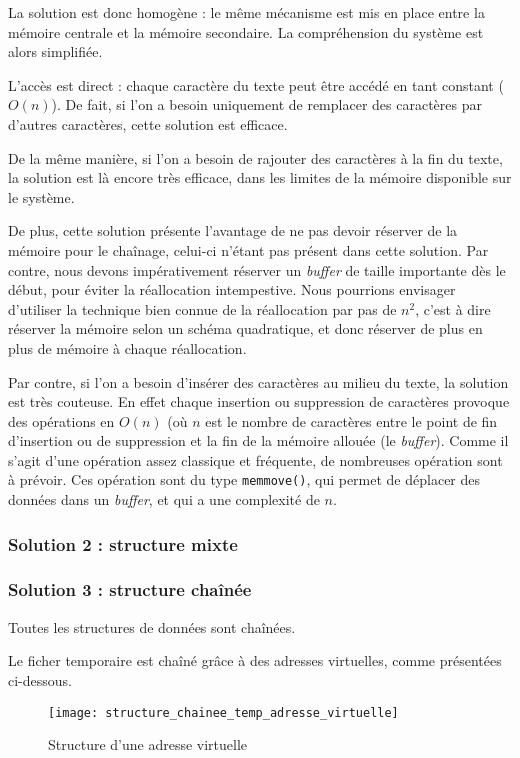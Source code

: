 La solution est donc homogène : le même mécanisme est mis en place entre la
mémoire centrale et la mémoire secondaire. La compréhension du système est
alors simplifiée.

L'accès est direct : chaque caractère du texte peut être accédé en tant
constant ($O(n)$). De fait, si l'on a besoin uniquement de remplacer des
caractères par d'autres caractères, cette solution est efficace.

De la même manière, si l'on a besoin de rajouter des caractères à la fin du
texte, la solution est là encore très efficace, dans les limites de la mémoire
disponible sur le système.

De plus, cette solution présente l'avantage de ne pas devoir réserver de la
mémoire pour le chaînage, celui-ci n'étant pas présent dans cette solution.
Par contre, nous devons impérativement réserver un \emph{buffer} de taille
importante dès le début, pour éviter la réallocation intempestive. Nous
pourrions envisager d'utiliser la technique bien connue de la réallocation par
pas de $n^2$, c'est à dire réserver la mémoire selon un schéma quadratique, et
donc réserver de plus en plus de mémoire à chaque réallocation.

Par contre, si l'on a besoin d'insérer des caractères au milieu du texte, la
solution est très couteuse. En effet chaque insertion ou suppression de
caractères provoque des opérations en $O(n)$ (où $n$ est le nombre de
caractères entre le point de fin d'insertion ou de suppression et la fin de la
mémoire allouée (le \emph{buffer}). Comme il s'agit d'une opération assez
classique et fréquente, de nombreuses opération sont à prévoir.  Ces opération
sont du type \texttt{memmove()}, qui permet de déplacer des données dans un
\emph{buffer}, et qui a une complexité de $n$.

\subsubsection{Solution 2 : structure mixte}

\subsubsection{Solution 3 : structure chaînée}
Toutes les structures de données sont chaînées.

Le ficher temporaire est chaîné grâce à des adresses virtuelles, comme présentées ci-dessous.

\begin{figure}[H]
	\centering
	\caption{Structure d'une adresse virtuelle}
	\texttt{[image: structure\_chainee\_temp\_adresse\_virtuelle]}
\end{figure}


